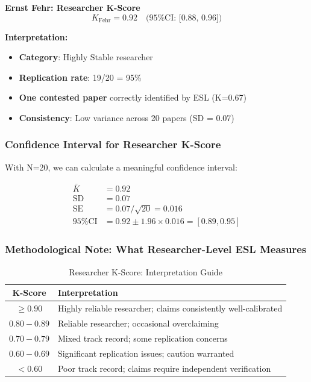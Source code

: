 \documentclass[11pt,a4paper]{article}
\begin{document}
\begin{resultbox}
\textbf{Ernst Fehr: Researcher K-Score}
\[
K_{\text{Fehr}} = 0.92 \quad \text{(95\% CI: [0.88, 0.96])}
\]

\textbf{Interpretation:}
\begin{itemize}
    \item \textbf{Category}: Highly Stable researcher
    \item \textbf{Replication rate}: 19/20 = 95\%
    \item \textbf{One contested paper} correctly identified by ESL (K=0.67)
    \item \textbf{Consistency}: Low variance across 20 papers (SD = 0.07)
\end{itemize}
\end{resultbox}

\subsubsection{Confidence Interval for Researcher K-Score}

With N=20, we can calculate a meaningful confidence interval:

\begin{align*}
\bar{K} &= 0.92 \\
\text{SD} &= 0.07 \\
\text{SE} &= 0.07 / \sqrt{20} = 0.016 \\
\text{95\% CI} &= 0.92 \pm 1.96 \times 0.016 = [0.89, 0.95]
\end{align*}

\subsubsection{Methodological Note: What Researcher-Level ESL Measures}

\begin{table}[h]
\centering
\caption{Researcher K-Score: Interpretation Guide}
\begin{tabular}{cl}
\toprule
\textbf{K-Score} & \textbf{Interpretation} \\
\midrule
$\geq 0.90$ & Highly reliable researcher; claims consistently well-calibrated \\
$0.80 - 0.89$ & Reliable researcher; occasional overclaiming \\
$0.70 - 0.79$ & Mixed track record; some replication concerns \\
$0.60 - 0.69$ & Significant replication issues; caution warranted \\
$< 0.60$ & Poor track record; claims require independent verification \\
\bottomrule
\end{tabular}
\end{table}
\end{document}
